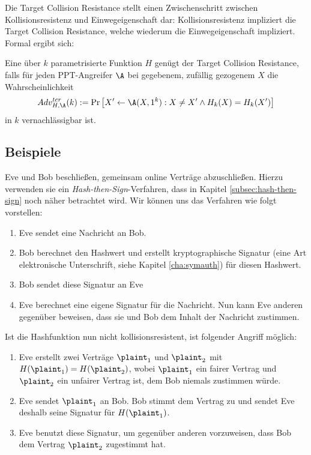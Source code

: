 Die Target Collision Resistance stellt einen Zwischenschritt zwischen
Kollisionsresistenz und Einwegeigenschaft dar: Kollisionsresistenz
impliziert die Target Collision Resistance, welche wiederum die
Einwegeigenschaft impliziert. Formal ergibt sich:

\begin{definition}
Eine über $k$ parametrisierte Funktion $H$ genügt der Target Collision
Resistance\indexTargetCollisionResistance, falls für jeden PPT-Angreifer
$\A$ bei gegebenem, zufällig gezogenem $X$ die Wahrscheinlichkeit
\begin{equation*}
Adv^{tcr}_{H,\A}(k):= \Pr \left[ X' \leftarrow \A(X, 1^k) : X \neq X'
  \land H_k(X) = H_k(X')\right] 
\end{equation*}
in $k$ vernachlässigbar ist.
\end{definition}
\subsection{Beispiele}

\begin{beispiel}\indexCollisionResistance
Eve und Bob beschließen, gemeinsam online Verträge abzuschließen. Hierzu
verwenden sie ein \textit{Hash-then-Sign}-Verfahren, dass in Kapitel
\ref{subsec:hash-then-sign} noch näher betrachtet wird. Wir können uns
das Verfahren wie 
folgt vorstellen: 
\begin{enumerate}
\item Eve sendet eine Nachricht an Bob.
\item Bob berechnet den Hashwert und erstellt kryptographische
  Signatur (eine Art \glqq elektronische Unterschrift\grqq, siehe
  Kapitel \ref{cha:symauth}) für diesen Hashwert.
\item Bob sendet diese Signatur an Eve
\item Eve berechnet eine eigene Signatur für die Nachricht. Nun kann Eve
  anderen gegenüber beweisen, dass sie und Bob dem Inhalt der Nachricht
  zustimmen. 
\end{enumerate}
Ist die Hashfunktion nun nicht kollisionsresistent, ist folgender
Angriff möglich:
\begin{enumerate}
\item Eve erstellt zwei Verträge $\plaint_1$ und $\plaint_2$ mit
  $H(\plaint_1) = H(\plaint_2)$, wobei
  $\plaint_1$ ein fairer Vertrag und $\plaint_2$ ein unfairer Vertrag
  ist, dem Bob niemals zustimmen würde.
\item Eve sendet $\plaint_1$ an Bob. Bob stimmt dem Vertrag zu und
  sendet Eve deshalb seine Signatur für $H(\plaint_1)$.
\item Eve benutzt diese Signatur, um gegenüber anderen vorzuweisen, dass
  Bob dem Vertrag $\plaint_2$ zugestimmt hat.
\end{enumerate}
\end{beispiel}

